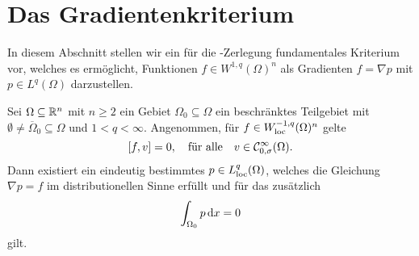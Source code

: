 \section{Das Gradientenkriterium}

In diesem Abschnitt stellen wir ein für die \helmholtz\hyp{}Zerlegung fundamentales Kriterium vor, welches es ermöglicht, Funktionen $f \in W^{1,q}(\Omega)^n$ als Gradienten $f = \nabla p$ mit $p \in L^q(\Omega)$ darzustellen.

\begin{lem}
  Sei $\Omega \subseteq \mathbb{R}^n$ mit $n \geq 2$ ein Gebiet $\Omega_0 \subseteq \Omega$ ein beschränktes Teilgebiet mit $\emptyset \neq \overline\Omega_0 \subseteq \Omega$ und $1 < q < \infty$.
  Angenommen, für $f \in W_{\operatorname{loc}}^{-1,q}(\Omega)^n$ gelte
  \begin{equation}
    \label{eq:vKernel}
    [f,v] = 0, \quad \text{für alle} \quad v \in \mathcal{C}_{0,\sigma}^\infty(\Omega).
  \end{equation}
  Dann existiert ein eindeutig bestimmtes $p \in L^q_{\operatorname{loc}}(\Omega)$, welches die Gleichung $\nabla p = f$ im distributionellen Sinne erfüllt und für das zusätzlich
  \begin{equation}
    \int_{\Omega_0} p \, {\operatorname{d}\!{x}} = 0
    \label{eq:0integral}
  \end{equation}
  gilt.
\end{lem}

